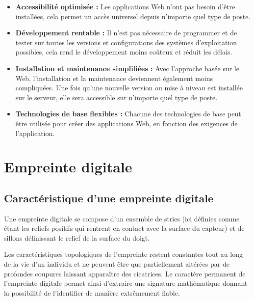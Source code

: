 \begin{itemize}
    \item[\textbullet] \textbf{Accessibilité optimisée :} Les
        applications Web n’ont pas besoin d’être installées, cela permet
        un accès universel depuis n’importe quel type de poste.
    
    \item[\textbullet] \textbf{Développement rentable :} Il n'est pas
        nécessaire de programmer et de tester sur toutes les versions et
        configurations des systèmes d'exploitation possibles, cela rend
        le développement moins coûteux et réduit les délais.
    
     \item[\textbullet] \textbf{Installation et maintenance simplifiées :}
        Avec l'approche basée sur le Web, l'installation et la
        maintenance deviennent également moins compliquées. Une fois
        qu'une nouvelle version ou mise à niveau est installée sur le
        serveur, elle sera accessible sur n'importe quel type de poste.
    
    \item[\textbullet] \textbf{Technologies de base flexibles :} Chacune
        des technologies de base peut être utilisée pour créer des
        applications Web, en fonction des exigences de
        l'application.\cite{2}
\end{itemize}
        
   
\section{Empreinte digitale}
\subsection{Caractéristique d’une empreinte digitale}
Une empreinte digitale se compose d’un ensemble de stries (ici définies comme
étant les reliefs positifs qui rentrent en contact avec la surface du capteur)
et de sillons définissant le relief de la surface du doigt. 
            
Les caractéristiques topologiques de l’empreinte restent constantes tout au long
de la vie d’un individu et ne peuvent être que partiellement altérées par de
profondes coupures laissant apparaître des cicatrices. Le caractère permanent de
l’empreinte digitale permet ainsi d’extraire une signature mathématique donnant
la possibilité de l’identifier de manière extrêmement fiable.\cite{3}
        

